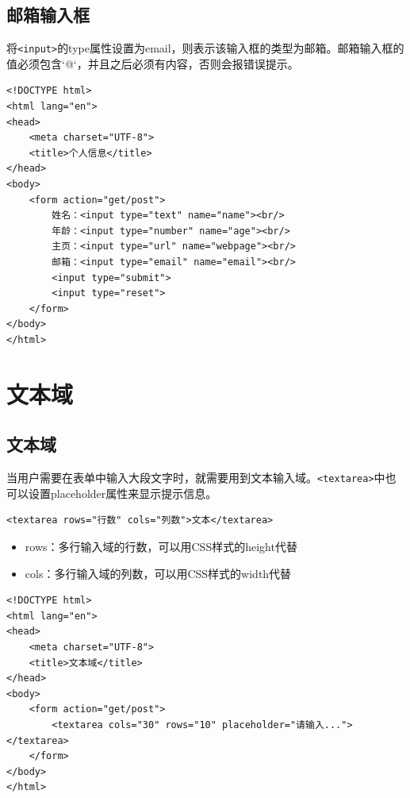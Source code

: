 \subsection{邮箱输入框}

将\lstinline|<input>|的type属性设置为email，则表示该输入框的类型为邮箱。邮箱输入框的值必须包含`@`，并且之后必须有内容，否则会报错误提示。

\begin{lstlisting}[style=htmlcssjs, title=个人信息]
<!DOCTYPE html>
<html lang="en">
<head>
    <meta charset="UTF-8">
    <title>个人信息</title>
</head>
<body>
    <form action="get/post">
        姓名：<input type="text" name="name"><br/>
        年龄：<input type="number" name="age"><br/>
        主页：<input type="url" name="webpage"><br/>
        邮箱：<input type="email" name="email"><br/>
        <input type="submit">
        <input type="reset">
    </form>
</body>
</html>
\end{lstlisting}

\newpage

\section{文本域}

\subsection{文本域}

当用户需要在表单中输入大段文字时，就需要用到文本输入域。\lstinline|<textarea>|中也可以设置placeholder属性来显示提示信息。 \\

\begin{lstlisting}[style=htmlcssjs]
<textarea rows="行数" cols="列数">文本</textarea>
\end{lstlisting}

\begin{itemize}
    \item rows：多行输入域的行数，可以用CSS样式的height代替
    \item cols：多行输入域的列数，可以用CSS样式的width代替
\end{itemize}

\begin{lstlisting}[style=htmlcssjs, title=文本域]
<!DOCTYPE html>
<html lang="en">
<head>
    <meta charset="UTF-8">
    <title>文本域</title>
</head>
<body>
    <form action="get/post">
        <textarea cols="30" rows="10" placeholder="请输入..."></textarea>
    </form>
</body>
</html>
\end{lstlisting}

